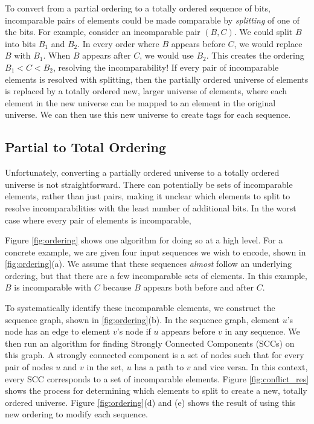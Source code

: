To convert from a partial ordering to a totally ordered sequence of bits, incomparable pairs of elements could be made comparable by \textit{splitting} of one of the bits. For example, consider an incomparable pair $(B, C)$. We could split $B$ into bits $B_1$ and $B_2$. In every order where $B$ appears before $C$, we would replace $B$ with $B_1$. When $B$ appears after $C$, we would use $B_2$. This creates the ordering $B_1 < C < B_2$, resolving the incomparability! If every pair of incomparable elements is resolved with splitting, then the partially ordered universe of elements is replaced by a totally ordered new, larger universe of elements, where each element in the new universe can be mapped to an element in the original universe. We can then use this new universe to create tags for each sequence. 

\subsection{Partial to Total Ordering}

Unfortunately, converting a partially ordered universe to a totally ordered universe is not straightforward. There can potentially be sets of incomparable elements, rather than just pairs, making it unclear which elements to split to resolve incomparabilities with the least number of additional bits. In the worst case where every pair of elements is incomparable, 

 Figure \ref{fig:ordering} shows one algorithm for doing so at a high level. For a concrete example, we are given four input sequences we wish to encode, shown in \ref{fig:ordering}(a). We assume that these sequences \textit{almost} follow an underlying ordering, but that there are a few incomparable sets of elements. In this example, $B$ is incomparable with $C$ because $B$ appears both before and after $C$. 

To systematically identify these incomparable elements, we construct the sequence graph, shown in \ref{fig:ordering}(b). In the sequence graph, element $u$'s node has an edge to element $v$'s node if $u$ appears before $v$ in any sequence. We then run an algorithm for finding Strongly Connected Components (SCCs) on this graph. A strongly connected component is a set of nodes such that for every pair of nodes $u$ and $v$ in the set, $u$ has a path to $v$ and vice versa. In this context, every SCC corresponds to a set of incomparable elements. Figure \ref{fig:conflict_res} shows the process for determining which elements to split to create a new, totally ordered universe. Figure \ref{fig:ordering}(d) and (e) shows the result of using this new ordering to modify each sequence. 


